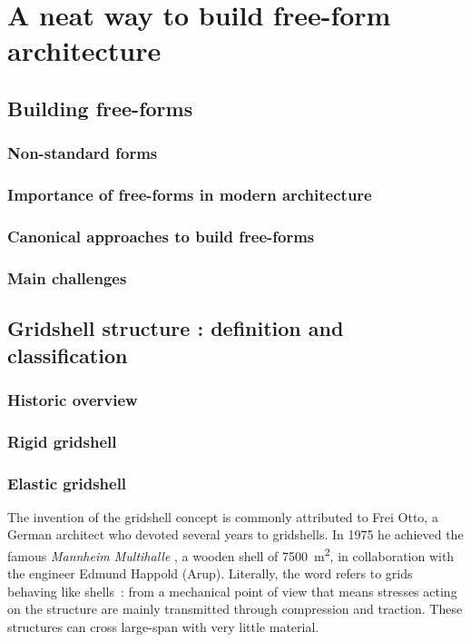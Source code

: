 \chapter{A neat way to build free-form architecture}

\section{Building free-forms}
\subsection{Non-standard forms}
\subsection{Importance of free-forms in modern architecture}
\subsection{Canonical approaches to build free-forms}
\subsection{Main challenges}

\section{Gridshell structure : definition and classification}
\subsection{Historic overview}
\subsection{Rigid gridshell}
\subsection{Elastic gridshell}

The invention of the gridshell concept is commonly attributed to Frei Otto, a German architect who devoted several years to gridshells. In 1975 he achieved the famous \emph{Mannheim Multihalle} \cite{Happold1975}, a wooden shell of 7500~m\textsuperscript{2}, in collaboration with the engineer Edmund Happold (Arup).
Literally, the word  refers to grids behaving like shells~: from a mechanical point of view that means stresses acting on the structure are mainly transmitted through compression and traction. These structures can cross large-span with very little material.

